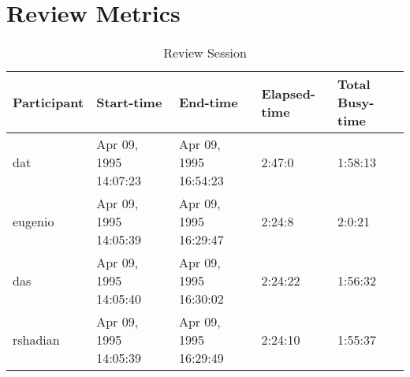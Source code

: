 \section{Review Metrics}
\begin{table}[hb]
\begin{center}
\begin{tabular}{|l|l|l|l|l|}
\hline
Participant & Start-time & End-time & Elapsed-time & Total Busy-time \\
\hline
dat & Apr 09, 1995 14:07:23 & Apr 09, 1995 16:54:23 & 2:47:0 & 1:58:13 \\
eugenio & Apr 09, 1995 14:05:39 & Apr 09, 1995 16:29:47 & 2:24:8 & 2:0:21 \\
das & Apr 09, 1995 14:05:40 & Apr 09, 1995 16:30:02 & 2:24:22 & 1:56:32 \\
rshadian & Apr 09, 1995 14:05:39 & Apr 09, 1995 16:29:49 & 2:24:10 & 1:55:37 \\
\hline
\end{tabular}
\end{center}
\caption{Review Session}
\end{table}


